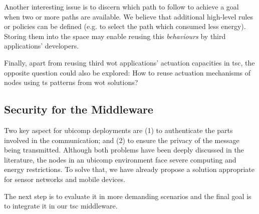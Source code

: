 % 
Another interesting issue is to discern which path to follow to achieve a goal when two or more paths are available.
We believe that additional high-level rules or policies can be defined (e.g. to select the path which consumed less energy).
Storing them into the space may enable reusing this \emph{behaviours} by third applications' developers.

Finally, apart from reusing third \ac{wot} applications' actuation capacities in \ac{tsc}, the opposite question could also be explored:
How to reuse actuation mechanisms of nodes using \ac{ts} patterns from \ac{wot} solutions?


\subsection{Security for the Middleware}

Two key aspect for \ac{ubicomp} deployments are
(1) to authenticate the parts involved in the communication; and
(2) to ensure the privacy of the message being transmitted.
Although both problems have been deeply discussed in the literature,
the nodes in an \ac{ubicomp} environment face severe computing and energy restrictions.
To solve that, we have already propose a solution appropriate for sensor networks and mobile devices.

The next step is to evaluate it in more demanding scenarios and the final goal is to integrate it in our \ac{tsc} middleware.



